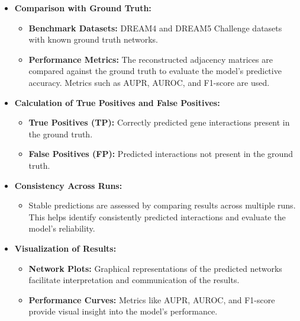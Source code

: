\documentclass{article}
\newcounter{subsubsubsection}[subsubsection]
\begin{document}
\vspace{0.2cm} %


\begin{itemize}
    \item \textbf{Comparison with Ground Truth:}
    \begin{itemize}
        \item \textbf{Benchmark Datasets:} DREAM4 and DREAM5 Challenge datasets with known ground truth networks.
        \item \textbf{Performance Metrics:} The reconstructed adjacency matrices are compared against the ground truth to evaluate the model's predictive accuracy. Metrics such as AUPR, AUROC, and F1-score are used.
    \end{itemize}

    \item \textbf{Calculation of True Positives and False Positives:}
    \begin{itemize}
        \item \textbf{True Positives (TP):} Correctly predicted gene interactions present in the ground truth.
        \item \textbf{False Positives (FP):} Predicted interactions not present in the ground truth.
    \end{itemize}

    \item \textbf{Consistency Across Runs:}
    \begin{itemize}
        \item Stable predictions are assessed by comparing results across multiple runs. This helps identify consistently predicted interactions and evaluate the model's reliability.
    \end{itemize}

    \item \textbf{Visualization of Results:}
    \begin{itemize}
        \item \textbf{Network Plots:} Graphical representations of the predicted networks facilitate interpretation and communication of the results.
        \item \textbf{Performance Curves:} Metrics like AUPR, AUROC, and F1-score provide visual insight into the model's performance.
    \end{itemize}
\end{itemize}
\end{document}
